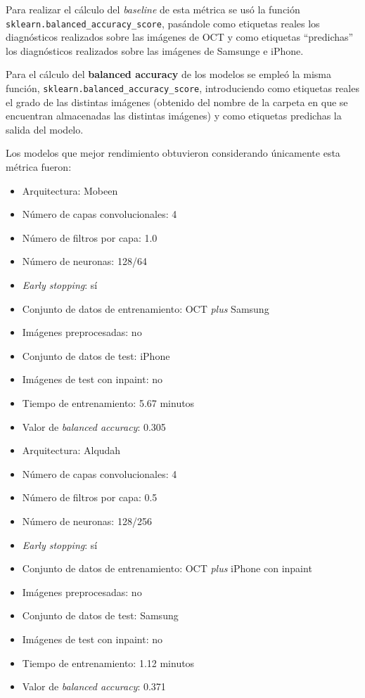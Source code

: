 Para realizar el cálculo del \textit{baseline} de esta métrica se usó la función \texttt{sklearn.balanced\_accuracy\_score}, pasándole como etiquetas reales los diagnósticos realizados sobre las imágenes de OCT y como etiquetas ``predichas'' los diagnósticos realizados sobre las imágenes de Samsunge e iPhone.

Para el cálculo del \textbf{balanced accuracy} de los modelos se empleó la misma función, \texttt{sklearn.balanced\_accuracy\_score}, introduciendo como etiquetas reales el grado de las distintas imágenes (obtenido del nombre de la carpeta en que se encuentran almacenadas las distintas imágenes) y como etiquetas predichas la salida del modelo.

Los modelos que mejor rendimiento obtuvieron considerando únicamente esta métrica fueron:

\begin{itemize}
    \item Arquitectura: Mobeen
    \item Número de capas convolucionales: 4
    \item Número de filtros por capa: 1.0
    \item Número de neuronas: 128/64
    \item \textit{Early stopping}: sí
    \item Conjunto de datos de entrenamiento: OCT \textit{plus} Samsung
    \item Imágenes preprocesadas: no
    \item Conjunto de datos de test: iPhone
    \item Imágenes de test con inpaint: no
    \item Tiempo de entrenamiento: 5.67 minutos
    \item Valor de \textit{balanced accuracy}: 0.305
\end{itemize}

\begin{itemize}
    \item Arquitectura: Alqudah
    \item Número de capas convolucionales: 4
    \item Número de filtros por capa: 0.5
    \item Número de neuronas: 128/256
    \item \textit{Early stopping}: sí
    \item Conjunto de datos de entrenamiento: OCT \textit{plus} iPhone con inpaint
    \item Imágenes preprocesadas: no
    \item Conjunto de datos de test: Samsung
    \item Imágenes de test con inpaint: no
    \item Tiempo de entrenamiento: 1.12 minutos
    \item Valor de \textit{balanced accuracy}: 0.371
\end{itemize}

